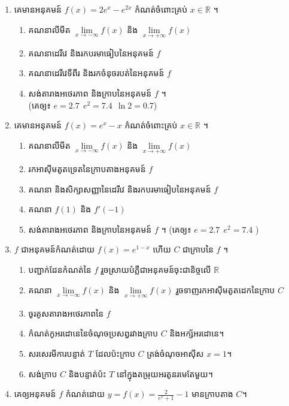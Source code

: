 \documentclass[12pt, a5paper]{article}
\begin{document}
\maketitle
\begin{enumerate}[m]
	\item គេមានអនុគមន៍ $f(x)=2e^x-e^{2x}$ កំណត់ចំពោះគ្រប់ $x\in \mathbb{R}$ ។
	\begin{enumerate}[k]
		\item គណនាលីមីត $\lim\limits_{x\to -\infty}f(x)$ និង $\lim\limits_{x\to +\infty} f(x)$ 
		\item គណនាដេរីវេ និងរកបរមាធៀបនៃអនុគមន៍ $f$
		\item គណនាដេរីវេទីពីរ និងរកចំនុចរបត់នៃអនុគមន៍ $f$
		\item សង់តារាងអថេរភាព និងក្រាបនៃអនុគមន៍ $f$ ។\\ (គេឲ្យ៖ $e=2.7~~e^2=7.4~~\ln2=0.7$) 
	\end{enumerate}
	\item គេមានអនុគមន៍ $f(x)=e^x-x$ កំណត់ចំពោះគ្រប់ $x\in \mathbb{R}$ ។
	\begin{enumerate}[k]
		\item គណនាលីមីត $\lim\limits_{x\to -\infty}f(x)$ និង $\lim\limits_{x\to +\infty} f(x)$ 
		\item រកអាស៊ីមតូតទ្រេតនៃក្រាបតាងអនុគមន៍ $f$
		\item គណនា និងសិក្សាសញ្ញានៃដេរីវេ និងរកបរមាធៀបនៃអនុគមន៍ $f$
		\item គណនា $f(1)$ និង $f'(-1)$
		\item សង់តារាងអថេរភាព និងក្រាបនៃអនុគមន៍ $f$ ។
		(គេឲ្យ៖ $e=2.7~~e^2=7.4$ )
	\end{enumerate}
	\item $f$ ជាអនុគមន៍កំណត់ដោយ $f(x)=e^{1-x}$ ហើយ $C$ ជាក្រាបនៃ $f$ ។
	\begin{enumerate}[k]
		\item បញ្ជាក់ដែនកំណត់នៃ $f$ រួចស្រាយបំភ្លឺជាអនុគមន៍ចុះជានិច្ចលើ $\mathbb{R}$
		\item គណនា $\lim\limits_{x\to -\infty}f(x)$ និង $\lim\limits_{x\to +\infty} f(x)$ រួចទាញរកអាស៊ីមតូតដេកនៃក្រាប $C$
		\item ចូរគូសតារាងអថេរភាពនៃ $f$
		\item កំណត់កូអរដោនេនៃចំណុចប្រសព្វរវាងក្រាប $C$ និងអក្ស័អរដោនេ។
		\item សរសេរមីការបន្ទាត់ $T$ ដែលប៉ះក្រាប $C$ ត្រង់ចំណុចអាស៊ីស $x=1$។
		\item សង់ក្រាប $C$ និងបន្ទាត់ប៉ះ $T$ នៅក្នុងតម្រុយអរតូនរមេតែមួយ។
	\end{enumerate}
	\item គេឲ្យអនុគមន៍ $f$ កំណត់ដោយ $y=f(x)=\frac{2}{e^x+1}-1$ មានក្រាបតាង $C$។ 

\end{enumerate}
\end{document}
